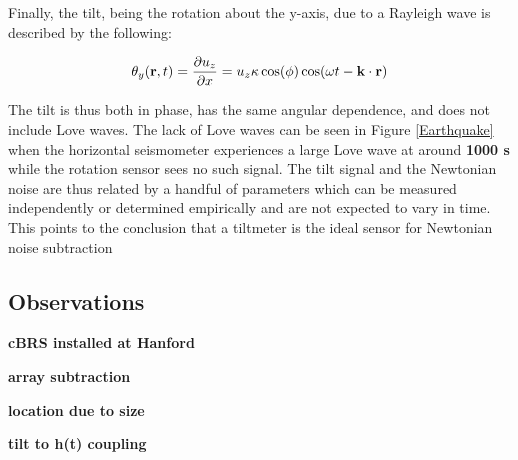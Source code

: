 \documentclass [12pt, proquest]{uwthesis}[2019]
\begin{document}
Finally, the tilt, being the rotation about the y-axis, due to a Rayleigh wave is described by the following:

\begin{equation}
\theta_y({\bf r} ,t)=\frac{\partial u_z}{\partial x}=u_z \kappa \cos(\phi) \cos(\omega t-{\bf k}\cdot{\bf r})\label{tX}\\
\end{equation}

The tilt is thus both in phase, has the same angular dependence, and does not include Love waves. The lack of Love waves can be seen in Figure \ref{Earthquake} when the horizontal seismometer experiences a large Love wave at around \textbf{1000 s} while the rotation sensor sees no such signal. The tilt signal and the Newtonian noise are thus related by a handful of parameters which can be measured independently or determined empirically and are not expected to vary in time. This points to the conclusion that a tiltmeter is the ideal sensor for Newtonian noise subtraction

\subsection{Observations}

\textbf{cBRS installed at Hanford}

\textbf{array subtraction}

\textbf{location due to size}

\textbf{tilt to h(t) coupling}

\printendnotes
\nocite{*}   


\end{document}
